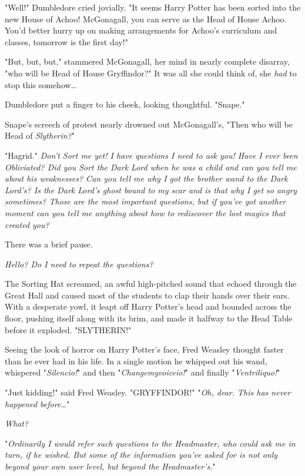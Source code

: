 "Well!" Dumbledore cried jovially. "It seems Harry Potter has been sorted into
the new House of Achoo! McGonagall, you can serve as the Head of House Achoo.
You'd better hurry up on making arrangements for Achoo's curriculum and
classes, tomorrow is the first day!"

"But, but, but," stammered McGonagall, her mind in nearly complete disarray,
"who will be Head of House Gryffindor?" It was all she could think of, she
\emph{had} to stop this somehow…

Dumbledore put a finger to his cheek, looking thoughtful. "Snape."

Snape's screech of protest nearly drowned out McGonagall's, "Then who will be
Head of \emph{Slytherin?}"

"Hagrid."
\later
\emph{Don't Sort me yet! I have questions I need to ask you! Have I ever been
Obliviated? Did you Sort the Dark Lord when he was a child and can you tell me
about his weaknesses? Can you tell me why I got the brother wand to the Dark
Lord's? Is the Dark Lord's ghost bound to my scar and is that why I get so
angry sometimes? Those are the most important questions, but if you've got
another moment can you tell me anything about how to rediscover the lost magics
that created you?}

There was a brief pause.

\emph{Hello? Do I need to repeat the questions?}

The Sorting Hat screamed, an awful high-pitched sound that echoed through the
Great Hall and caused most of the students to clap their hands over their ears.
With a desperate yowl, it leapt off Harry Potter's head and bounded across the
floor, pushing itself along with its brim, and made it halfway to the Head
Table before it exploded.
\later
"SLYTHERIN!"

Seeing the look of horror on Harry Potter's face, Fred Weasley thought faster
than he ever had in his life. In a single motion he whipped out his wand,
whispered "\emph{Silencio!}" and then "\emph{Changemyvoiceio!}" and finally
"\emph{Ventriliquo!}"

"Just kidding!" said Fred Weasley. "GRYFFINDOR!"
\later
"\emph{Oh, dear. This has never happened before…}"

\emph{What?}

"\emph{Ordinarily I would refer such questions to the Headmaster, who could ask
me in turn, if he wished. But some of the information you've asked for is not
only beyond your own user level, but beyond the Headmaster's.}"

